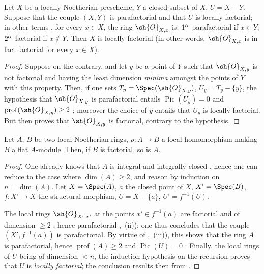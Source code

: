 
\begin{corollary}[21.13.11]
\label{IV.21.13.11}
Let $X$ be a locally Noetherian prescheme, $Y$ a closed subset of $X$, $U=X-Y$.
Suppose that the couple $(X,Y)$ is parafactorial and that $U$ is locally factorial; in other terms , for every $x\in X$, the ring $\sh{O}_{X,x}$ is: $1\textsuperscript{o}$~parafactorial if $x\in Y$; $2\textsuperscript{o}$~factorial if $x\notin Y$.
Then $X$ is locally factorial (in other words, $\sh{O}_{X,x}$ is in fact factorial for every $x\in X$).
\end{corollary}

\begin{proof}
Suppose on the contrary, and let $y$ be a point of $Y$ such that $\sh{O}_{X,y}$ is not factorial and having the least dimension \emph{minima} amongst the points of $Y$ with this property.
Then, if one sets $T_y=\Spec(\sh{O}_{X,y})$, $U_y=T_y-\{y\}$, the hypothesis that $\sh{O}_{X,y}$ is parafactorial entails $\operatorname{Pic}(U_y)=0$ and $\operatorname{prof}(\sh{O}_{X,y})\geq 2$ ; moreover the choice of $y$ entails that $U_y$ is locally factorial.
But then  proves that $\sh{O}_{X,y}$ is factorial, contrary to the hypothesis.
\end{proof}

\begin{proposition}[21.13.12]
\label{IV.21.13.12}
Let $A$, $B$ be two local Noetherian rings, $\rho:A\to B$ a local homomorphism making $B$ a flat $A$-module.
Then, if $B$ is factorial, so is $A$.
\end{proposition}

\begin{proof}
One already knows that $A$ is integral and integrally closed , hence one can reduce to the case where $\dim(A)\geq 2$, and reason by induction on $n=\dim(A)$.
Let $X=\Spec(A)$, $a$ the closed point of $X$, $X'=\Spec(B)$, $f:X'\to X$ the structural morphism, $U=X-\{a\}$, $U'=f^{-1}(U)$.

The local rings $\sh{O}_{X',x'}$ at the points $x'\in f^{-1}(a)$ are factorial and of dimension $\geq 2$ , hence parafactorial ,~(ii)); one thus concludes  that the couple $(X',f^{-1}(a))$ is parafactorial.
By virtue of ,~(iii)), this shows that the ring $A$ is parafactorial, hence $\operatorname{prof}(A)\geq 2$ and $\operatorname{Pic}(U)=0$ .
Finally, the local rings of $U$ being of dimension $<n$, the induction hypothesis on the recursion proves that $U$ is \emph{locally factorial}; the conclusion results then from .
\end{proof}

